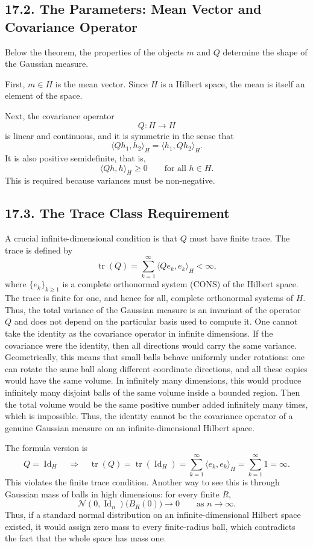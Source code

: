 \documentclass[11pt]{article}
\theoremstyle{definition}
\theoremstyle{remark}
\begin{document}
\subsection*{17.2. The Parameters: Mean Vector and Covariance Operator}
Below the theorem, the properties of the objects $m$ and $Q$ determine the shape of the Gaussian measure.

First, $m\in H$ is the mean vector. Since $H$ is a Hilbert space, the mean is itself an element of the space.

Next, the covariance operator
\[
Q:H\to H
\]
is linear and continuous, and it is symmetric in the sense that
\[
\langle Qh_1,h_2\rangle_H=\langle h_1,Qh_2\rangle_H.
\]
It is also positive semidefinite, that is,
\[
\langle Qh,h\rangle_H\ge 0
\qquad \text{for all } h\in H.
\]
This is required because variances must be non-negative.

\subsection*{17.3. The Trace Class Requirement}
A crucial infinite-dimensional condition is that $Q$ must have finite trace. The trace is defined by
\[
\operatorname{tr}(Q)=\sum_{k=1}^{\infty}\langle Qe_k,e_k\rangle_H<\infty,
\]
where $\{e_k\}_{k\ge 1}$ is a complete orthonormal system (CONS) of the Hilbert space. The trace is finite for one, and hence for all, complete orthonormal systems of $H$. Thus, the total variance of the Gaussian measure is an invariant of the operator $Q$ and does not depend on the particular basis used to compute it.
One cannot take the identity as the covariance operator in infinite dimensions. If the covariance were the identity, then all directions would carry the same variance. Geometrically, this means that small balls behave uniformly under rotations: one can rotate the same ball along different coordinate directions, and all these copies would have the same volume. In infinitely many dimensions, this would produce infinitely many disjoint balls of the same volume inside a bounded region. Then the total volume would be the same positive number added infinitely many times, which is impossible. Thus, the identity cannot be the covariance operator of a genuine Gaussian measure on an infinite-dimensional Hilbert space.

The formula version is
\[
Q
=
\operatorname{Id}_H
\quad\Longrightarrow\quad
\operatorname{tr}(Q)
=
\operatorname{tr}(\operatorname{Id}_H)
=
\sum_{k=1}^{\infty}\langle e_k,e_k\rangle_H
=
\sum_{k=1}^{\infty}1
=
\infty.
\]
This violates the finite trace condition.
Another way to see this is through Gaussian mass of balls in high dimensions: for every finite $R$,
\[
\mathcal N(0,\operatorname{Id}_n)\bigl(B_R(0)\bigr)\to 0
\qquad \text{as } n\to\infty.
\]
Thus, if a standard normal distribution on an infinite-dimensional Hilbert space existed, it would assign zero mass to every finite-radius ball, which contradicts the fact that the whole space has mass one.
\end{document}
